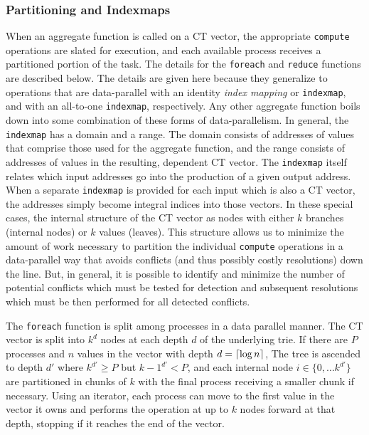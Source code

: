 \documentclass[pageno]{jpaper}
\DeclarePairedDelimiter\ceil{\lceil}{\rceil}
\begin{document}
\subsubsection{Partitioning and Indexmaps}
When an aggregate function is called on a CT vector, the appropriate \texttt{compute} 
operations are slated for execution, and each available process receives a partitioned 
portion of the task. The details for the \texttt{foreach} and \texttt{reduce} functions 
are described below. The details are given here because they generalize to operations 
that are data-parallel with an identity \textit{index mapping} or \texttt{indexmap}, and with an 
all-to-one \texttt{indexmap}, respectively. Any other aggregate function boils down into some 
combination of these forms of data-parallelism. In general, the \texttt{indexmap} has a domain 
and a range. The domain consists of addresses of values that comprise those used for 
the aggregate function, and the range consists of addresses of values in the resulting, 
dependent CT vector. The \texttt{indexmap} itself relates which input addresses 
go into the production of a given output address. When a separate \texttt{indexmap} is 
provided for each input which is also a CT vector, the addresses simply become integral 
indices into those vectors. In these special cases, the internal structure of the CT 
vector as nodes with either $k$ branches (internal nodes) or $k$ values (leaves). This 
structure allows us to minimize the amount of work necessary to partition the individual 
\texttt{compute} operations in a data-parallel way that avoids conflicts (and thus 
possibly costly resolutions) down the line. But, in general, it is possible to identify 
and minimize the number of potential conflicts which must be tested for detection and 
subsequent resolutions which must be then performed for all detected conflicts.

The \texttt{foreach} function is split among processes in a data parallel
manner. The CT vector is split into $k^d$ nodes at each depth $d$  of the
underlying trie. If there are $P$ processes and $n$ values in the vector with
depth $d = \ceil{\log{n}}$, The tree is ascended to depth $d'$ where $k^{d'} \geq P$
but ${k-1}^{d'} < P$, and each internal node $i \in \{0, \dots k^{d'}\}$ are
partitioned in chunks of $k$ with the final process receiving a smaller chunk if
necessary. Using an iterator, each process can move to the first value in the
vector it owns and performs the operation at up to $k$ nodes forward at that
depth, stopping if it reaches the end of the vector.
\end{document}
